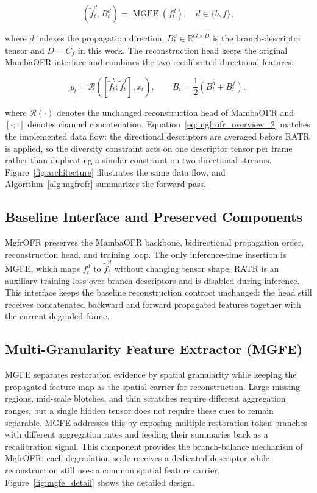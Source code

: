 \documentclass[symmetry,article,submit,pdftex,moreauthors]{Definitions/mdpi}
\begin{document}
\begin{equation}
\left(\widetilde{f}_t^{d}, B_t^{d}\right)=\operatorname{MGFE}\!\left(f_t^{d}\right), \quad d \in \{b,f\},
\end{equation}

where $d$ indexes the propagation direction, $B_t^{d} \in \mathbb{R}^{G \times D}$ is the branch-descriptor tensor and $D=C_f$ in this work. The reconstruction head keeps the original MambaOFR interface and combines the two recalibrated directional features:

\begin{equation}
y_t = \mathcal{R}\!\left([\widetilde{f}_t^{b};\widetilde{f}_t^{f}], x_t\right),
\qquad
B_t = \frac{1}{2}\left(B_t^{b}+B_t^{f}\right),
\label{eq:mgfrofr_overview_2}
\end{equation}

where $\mathcal{R}(\cdot)$ denotes the unchanged reconstruction head of MambaOFR and $[\cdot;\cdot]$ denotes channel concatenation. Equation~\eqref{eq:mgfrofr_overview_2} matches the implemented data flow: the directional descriptors are averaged before RATR is applied, so the diversity constraint acts on one descriptor tensor per frame rather than duplicating a similar constraint on two directional streams. Figure~\ref{fig:architecture} illustrates the same data flow, and Algorithm~\ref{alg:mgfrofr} summarizes the forward pass.

\subsection{Baseline Interface and Preserved Components}
\label{subsec:baseline_interface}

MgfrOFR preserves the MambaOFR backbone, bidirectional propagation order, reconstruction head, and training loop. The only inference-time insertion is MGFE, which maps $f_t^{d}$ to $\widetilde{f}_t^{d}$ without changing tensor shape. RATR is an auxiliary training loss over branch descriptors and is disabled during inference. This interface keeps the baseline reconstruction contract unchanged: the head still receives concatenated backward and forward propagated features together with the current degraded frame.

\subsection{Multi-Granularity Feature Extractor (MGFE)}
\label{subsec:mgfe}

MGFE separates restoration evidence by spatial granularity while keeping the propagated feature map as the spatial carrier for reconstruction. Large missing regions, mid-scale blotches, and thin scratches require different aggregation ranges, but a single hidden tensor does not require these cues to remain separable. MGFE addresses this by exposing multiple restoration-token branches with different aggregation rates and feeding their summaries back as a recalibration signal. This component provides the branch-balance mechanism of MgfrOFR: each degradation scale receives a dedicated descriptor while reconstruction still uses a common spatial feature carrier. Figure~\ref{fig:mgfe_detail} shows the detailed design.
\end{document}
